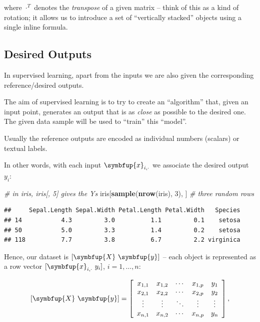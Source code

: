 \documentclass[10pt,b5paper,krantz1]{krantz}
\newenvironment{Shaded}{\begin{snugshade}}{\end{snugshade}}
\newcommand{\CommentTok}[1]{\textcolor[rgb]{0.37,0.37,0.37}{\textit{#1}}}
\newcommand{\DecValTok}[1]{\textcolor[rgb]{0.06,0.06,0.06}{#1}}
\newcommand{\KeywordTok}[1]{\textcolor[rgb]{0.27,0.27,0.27}{\textbf{#1}}}
\newcommand{\NormalTok}[1]{#1}
\renewcommand{\mathbf}[1]{\symbfup{#1}}
\begin{document}
where \(\cdot^T\) denotes the \emph{transpose} of a given matrix --
think of this as a kind of rotation; it allows us to introduce a set of
``vertically stacked'' objects using a single inline formula.

\hypertarget{desired-outputs}{%
\subsection{Desired Outputs}\label{desired-outputs}}

In supervised learning,
apart from the inputs we are also given the corresponding
reference/desired outputs.

The aim of supervised learning is to try to create an ``algorithm'' that,
given an input point, generates an output that is as \emph{close} as possible
to the desired one. The given data sample will be used to ``train'' this ``model''.

Usually the reference outputs are encoded as individual numbers (scalars)
or textual labels.

In other words, with each input \(\mathbf{x}_{i,\cdot}\) we associate
the desired output \(y_i\):

\begin{Shaded}
\begin{Highlighting}[]
\CommentTok{# in iris, iris[, 5] gives the Ys}
\NormalTok{iris[}\KeywordTok{sample}\NormalTok{(}\KeywordTok{nrow}\NormalTok{(iris), }\DecValTok{3}\NormalTok{), ]  }\CommentTok{# three random rows}
\end{Highlighting}
\end{Shaded}

\begin{verbatim}
##     Sepal.Length Sepal.Width Petal.Length Petal.Width   Species
## 14           4.3         3.0          1.1         0.1    setosa
## 50           5.0         3.3          1.4         0.2    setosa
## 118          7.7         3.8          6.7         2.2 virginica
\end{verbatim}

Hence, our dataset is \([\mathbf{X}\ \mathbf{y}]\) --
each object is represented as a row vector
\([\mathbf{x}_{i,\cdot}\ y_i]\), \(i=1,\dots,n\):

\[
[\mathbf{X}\ \mathbf{y}]=
\left[
\begin{array}{ccccc}
x_{1,1} & x_{1,2} & \cdots & x_{1,p} & y_1\\
x_{2,1} & x_{2,2} & \cdots & x_{2,p} & y_2\\
\vdots & \vdots & \ddots & \vdots    & \vdots\\
x_{n,1} & x_{n,2} & \cdots & x_{n,p} & y_n\\
\end{array}
\right],
\]
\end{document}
